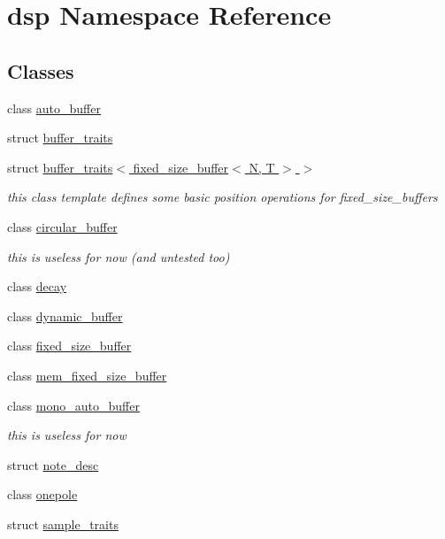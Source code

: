 \hypertarget{namespacedsp}{}\section{dsp Namespace Reference}
\label{namespacedsp}
\subsection*{Classes}
\begin{DoxyCompactItemize}
\item 
class \hyperlink{classdsp_1_1auto__buffer}{auto\+\_\+buffer}
\item 
struct \hyperlink{structdsp_1_1buffer__traits}{buffer\+\_\+traits}
\item 
struct \hyperlink{structdsp_1_1buffer__traits_3_01fixed__size__buffer_3_01_n_00_01_t_01_4_01_4}{buffer\+\_\+traits$<$ fixed\+\_\+size\+\_\+buffer$<$ N, T $>$ $>$}
\begin{DoxyCompactList}\small\item\em this class template defines some basic position operations for fixed\+\_\+size\+\_\+buffers \end{DoxyCompactList}\item 
class \hyperlink{classdsp_1_1circular__buffer}{circular\+\_\+buffer}
\begin{DoxyCompactList}\small\item\em this is useless for now (and untested too) \end{DoxyCompactList}\item 
class \hyperlink{classdsp_1_1decay}{decay}
\item 
class \hyperlink{classdsp_1_1dynamic__buffer}{dynamic\+\_\+buffer}
\item 
class \hyperlink{classdsp_1_1fixed__size__buffer}{fixed\+\_\+size\+\_\+buffer}
\item 
class \hyperlink{classdsp_1_1mem__fixed__size__buffer}{mem\+\_\+fixed\+\_\+size\+\_\+buffer}
\item 
class \hyperlink{classdsp_1_1mono__auto__buffer}{mono\+\_\+auto\+\_\+buffer}
\begin{DoxyCompactList}\small\item\em this is useless for now \end{DoxyCompactList}\item 
struct \hyperlink{structdsp_1_1note__desc}{note\+\_\+desc}
\item 
class \hyperlink{classdsp_1_1onepole}{onepole}
\item 
struct \hyperlink{structdsp_1_1sample__traits}{sample\+\_\+traits}

\end{DoxyCompactItemize}
